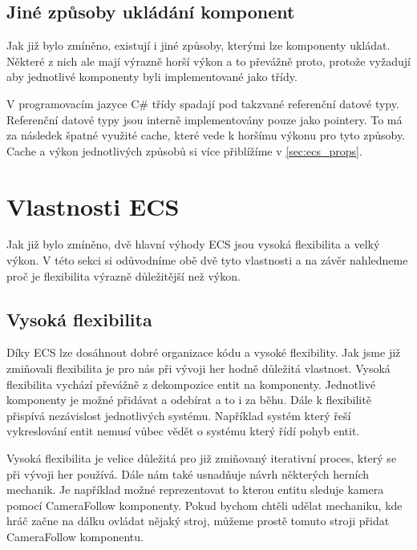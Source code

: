 


\subsection{Jiné způsoby ukládání komponent}
\label{sec:component_as_pointers}
Jak již bylo zmíněno, existují i jiné způsoby, kterými lze komponenty ukládat. Některé z nich ale mají výrazně horší výkon a to převážně proto, protože vyžadují aby jednotlivé komponenty byli implementované jako třídy.

V programovacím jazyce C\# třídy spadají pod takzvané referenční datové typy. Referenční datové typy jsou interně implementovány pouze jako pointery. To má za následek špatné využité cache, které vede k horšímu výkonu pro tyto způsoby. Cache a výkon jednotlivých způsobů si více přiblížíme v \ref{sec:ecs_props}.


\section{Vlastnosti ECS}
Jak již bylo zmíněno, dvě hlavní výhody ECS jsou vysoká flexibilita a velký výkon. V této sekci si odůvodníme obě dvě tyto vlastnosti a na závěr nahledneme proč je flexibilita výrazně důležitější než výkon.

\subsection{Vysoká flexibilita}

Díky ECS lze dosáhnout dobré organizace kódu a vysoké flexibility. Jak jsme již zmiňovali flexibilita je pro nás při vývoji her hodně důležitá vlastnost. Vysoká flexibilita vychází převážně z dekompozice entit na komponenty. Jednotlivé komponenty je možné přidávat a odebírat a to i za běhu. Dále k flexibilitě přispívá nezávislost jednotlivých systému. Například systém který řeší vykreslování entit nemusí vůbec vědět o systému který řídí pohyb entit.

Vysoká flexibilita je velice důležitá pro již zmiňovaný iterativní proces, který se při vývoji her používá. Dále nám také usnadňuje návrh některých herních mechanik. Je například možné reprezentovat to kterou entitu sleduje kamera pomocí CameraFollow komponenty. Pokud bychom chtěli udělat mechaniku, kde hráč začne na dálku ovládat nějaký stroj, můžeme prostě tomuto stroji přidat CameraFollow komponentu.

